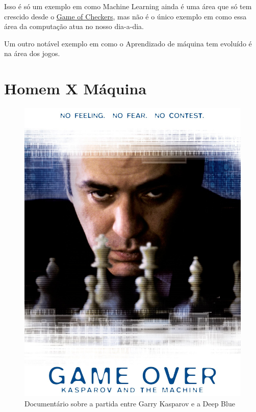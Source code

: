 \documentclass[12pt]{article}
\begin{document}
    Isso é só um exemplo em como Machine Learning ainda é uma área que só tem 
    crescido desde o \href{../Capitulo_01/Capitulo01.pdf}{Game of Checkers}, mas não é 
    o único exemplo em como essa área da computação atua no nosso dia-a-dia.

    Um outro notável exemplo em como o Aprendizado de máquina tem evoluído é
    na área dos jogos.

    \newpage
    \section{Homem X Máquina} \label{sec:deep_blue}

    \begin{figure}[htp]
        \centering
        \includegraphics[scale=0.2]{GameOver.jpg}
        \caption{\centering Documentário sobre a partida entre Garry Kasparov e a Deep Blue}
    \end{figure}
\end{document}
